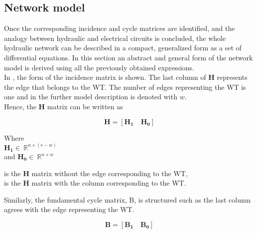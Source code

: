 \subsection{Network model}  
\label{ParameterEstimation}

Once the corresponding incidence and cycle matrices are identified, and the analogy between hydraulic and electrical circuits is concluded, the whole hydraulic network can be described in a compact, generalized form as a set of differential equations. In this section an abstract and general form of the network model is derived using all the previously obtained expressions. 
\\
In , the form of the incidence matrix is shown. The last column of $\bm{H}$ represents the edge that belongs to the WT. The number of edges representing the WT is one and in the further model description is denoted with $w$. 
\\
Hence, the $\bm{H}$ matrix can be written as 

\begin {equation}
\bm{H} = [\bm{H_1} \quad \bm{H_0}]
\label{Hmatrix}
\end{equation}

\begin{minipage}[t]{0.24\textwidth}
Where\\
\hspace*{8mm} $\bm{H_1} \in \: \mathbb{R}^{n \times (e-w)}$  \\
and \hspace*{0.4mm} $\bm{H_0} \in \: \mathbb{R}^{n \times w} $ 
\end{minipage}
\begin{minipage}[t]{0.70\textwidth}
\vspace*{2mm}
\hspace*{4mm} is the $\bm{H}$ matrix without the edge corresponding to the WT,\\
\hspace*{4mm} is the $\bm{H}$ matrix with the column corresponding to the WT. 
\end{minipage}

Similarly, the fundamental cycle matrix, B, is structured such as the last column agrees with the edge representing the WT.

\begin{equation}
  \bm{B} = [\bm{B_1} \quad \bm{B_0}]
\end{equation} 

